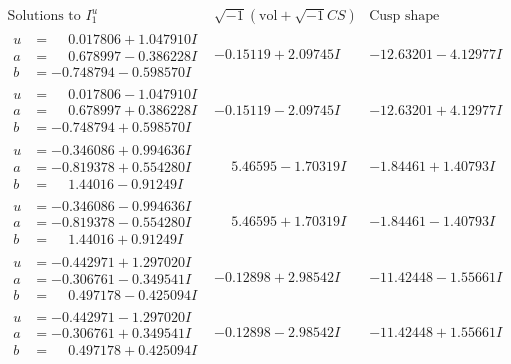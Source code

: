 \documentclass[1p]{elsarticle_modified}
\theoremstyle{definition}
\newcommand{\I}{\sqrt{-1}}
\begin{document}
$$\begin{array}{c|c|c}  
\text{Solutions to }I^u_{1}& \I (\text{vol} + \sqrt{-1}CS) & \text{Cusp shape}\\
 \hline 
\begin{aligned}
u &= \phantom{-}0.017806 + 1.047910 I \\
a &= \phantom{-}0.678997 - 0.386228 I \\
b &= -0.748794 - 0.598570 I\end{aligned}
 & -0.15119 + 2.09745 I & -12.63201 - 4.12977 I \\ \hline\begin{aligned}
u &= \phantom{-}0.017806 - 1.047910 I \\
a &= \phantom{-}0.678997 + 0.386228 I \\
b &= -0.748794 + 0.598570 I\end{aligned}
 & -0.15119 - 2.09745 I & -12.63201 + 4.12977 I \\ \hline\begin{aligned}
u &= -0.346086 + 0.994636 I \\
a &= -0.819378 + 0.554280 I \\
b &= \phantom{-}1.44016 - 0.91249 I\end{aligned}
 & \phantom{-}5.46595 - 1.70319 I & -1.84461 + 1.40793 I \\ \hline\begin{aligned}
u &= -0.346086 - 0.994636 I \\
a &= -0.819378 - 0.554280 I \\
b &= \phantom{-}1.44016 + 0.91249 I\end{aligned}
 & \phantom{-}5.46595 + 1.70319 I & -1.84461 - 1.40793 I \\ \hline\begin{aligned}
u &= -0.442971 + 1.297020 I \\
a &= -0.306761 - 0.349541 I \\
b &= \phantom{-}0.497178 - 0.425094 I\end{aligned}
 & -0.12898 + 2.98542 I & -11.42448 - 1.55661 I \\ \hline\begin{aligned}
u &= -0.442971 - 1.297020 I \\
a &= -0.306761 + 0.349541 I \\
b &= \phantom{-}0.497178 + 0.425094 I\end{aligned}
 & -0.12898 - 2.98542 I & -11.42448 + 1.55661 I \\ \hline\begin{aligned}

\end{aligned}
\end{array}$$
\end{document}
